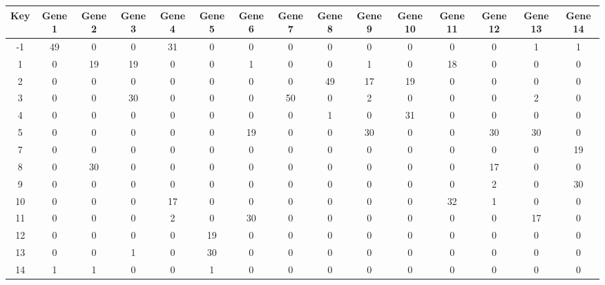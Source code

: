 \begin{tabular}{|c|c|c|c|c|c|c|c|c|c|c|c|c|c|c|}
\hline
Key & Gene 1 & Gene 2 & Gene 3 & Gene 4 & Gene 5 & Gene 6 & Gene 7 & Gene 8 & Gene 9 & Gene 10 & Gene 11 & Gene 12 & Gene 13 & Gene 14 \\
\hline
-1 & 49 & 0 & 0 & 31 & 0 & 0 & 0 & 0 & 0 & 0 & 0 & 0 & 1 & 1 \\
1 & 0 & 19 & 19 & 0 & 0 & 1 & 0 & 0 & 1 & 0 & 18 & 0 & 0 & 0 \\
2 & 0 & 0 & 0 & 0 & 0 & 0 & 0 & 49 & 17 & 19 & 0 & 0 & 0 & 0 \\
3 & 0 & 0 & 30 & 0 & 0 & 0 & 50 & 0 & 2 & 0 & 0 & 0 & 2 & 0 \\
4 & 0 & 0 & 0 & 0 & 0 & 0 & 0 & 1 & 0 & 31 & 0 & 0 & 0 & 0 \\
5 & 0 & 0 & 0 & 0 & 0 & 19 & 0 & 0 & 30 & 0 & 0 & 30 & 30 & 0 \\
7 & 0 & 0 & 0 & 0 & 0 & 0 & 0 & 0 & 0 & 0 & 0 & 0 & 0 & 19 \\
8 & 0 & 30 & 0 & 0 & 0 & 0 & 0 & 0 & 0 & 0 & 0 & 17 & 0 & 0 \\
9 & 0 & 0 & 0 & 0 & 0 & 0 & 0 & 0 & 0 & 0 & 0 & 2 & 0 & 30 \\
10 & 0 & 0 & 0 & 17 & 0 & 0 & 0 & 0 & 0 & 0 & 32 & 1 & 0 & 0 \\
11 & 0 & 0 & 0 & 2 & 0 & 30 & 0 & 0 & 0 & 0 & 0 & 0 & 17 & 0 \\
12 & 0 & 0 & 0 & 0 & 19 & 0 & 0 & 0 & 0 & 0 & 0 & 0 & 0 & 0 \\
13 & 0 & 0 & 1 & 0 & 30 & 0 & 0 & 0 & 0 & 0 & 0 & 0 & 0 & 0 \\
14 & 1 & 1 & 0 & 0 & 1 & 0 & 0 & 0 & 0 & 0 & 0 & 0 & 0 & 0 \\
\hline
\end{tabular}